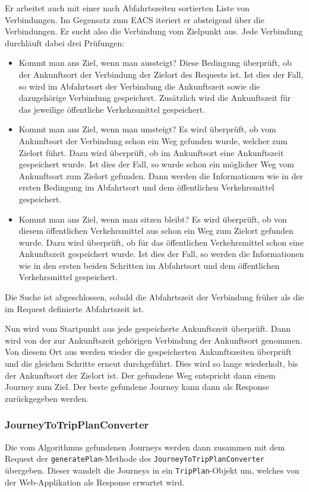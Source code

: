 Er arbeitet auch mit einer nach Abfahrtszeiten sortierten Liste von Verbindungen. Im Gegensatz zum EACS iteriert er absteigend über die Verbindungen. Er sucht also die Verbindung vom Zielpunkt aus. Jede Verbindung durchläuft dabei drei Prüfungen:

\begin{itemize}
	\item Kommt man ans Ziel, wenn man aussteigt?	\newline
	Diese Bedingung überprüft, ob der Ankunftsort der Verbindung der Zielort des Requests ist. Ist dies der Fall, so wird im Abfahrtsort der Verbindung die Ankunftszeit sowie die dazugehörige Verbindung gespeichert. Zusätzlich wird die Ankunftszeit für das jeweilige öffentliche Verkehrsmittel gespeichert.
	\item Kommt man ans Ziel, wenn man umsteigt? \newline
	Es wird überprüft, ob vom Ankunftsort der Verbindung schon ein Weg gefunden wurde, welcher zum Zielort führt. Dazu wird überprüft, ob im Ankunftsort eine Ankunftszeit gespeichert wurde. Ist dies der Fall, so wurde schon ein möglicher Weg vom Ankunftsort zum Zielort gefunden. Dann werden die Informationen wie in der ersten Bedingung im Abfahrtsort und dem öffentlichen Verkehrsmittel gespeichert.
	\item Kommt man ans Ziel, wenn man sitzen bleibt? \newline
	Es wird überprüft, ob von diesem öffentlichen Verkehrsmittel aus schon ein Weg zum Zielort gefunden wurde. Dazu wird überprüft, ob für das öffentlichen Verkehrsmittel schon eine Ankunftszeit gespeichert wurde. Ist dies der Fall, so werden die Informationen wie in den ersten beiden Schritten im Abfahrtsort und dem öffentlichen Verkehrsmittel gespeichert.
\end{itemize}
Die Suche ist abgeschlossen, sobald die Abfahrtszeit der Verbindung früher als die im Request definierte Abfahrtszeit ist. \newline

Nun wird vom Startpunkt aus jede gespeicherte Ankunftszeit überprüft. Dann wird von der zur Ankunftszeit gehörigen Verbindung der Ankunftsort genommen. Von diesem Ort aus werden wieder die gespeicherten Ankunftszeiten überprüft und die gleichen Schritte erneut durchgeführt. Dies wird so lange wiederholt, bis der Ankunftsort der Zielort ist. Der gefundene Weg entspricht dann einem Journey zum Ziel. Der beste gefundene Journey kann dann als Response zurückgegeben werden. 
\subsubsection{JourneyToTripPlanConverter}
Die vom \hypertarget{journeyToTripPlanConverter}{Algorithmus} gefundenen Journeys werden dann zusammen mit dem Request der \texttt{generatePlan}-Methode des \texttt{JourneyToTripPlanConverter} übergeben. Dieser wandelt die Journeys in ein \texttt{TripPlan}-Objekt um, welches von der Web-Applikation als Response erwartet wird. \newline

